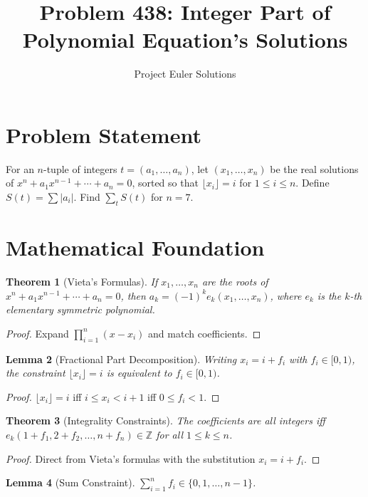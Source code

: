 \documentclass[11pt]{article}
\title{Problem 438: Integer Part of Polynomial Equation's Solutions}
\author{Project Euler Solutions}
\date{}
\newtheorem{theorem}{Theorem}
\newtheorem{lemma}[theorem]{Lemma}
\begin{document}
\maketitle

\section{Problem Statement}
For an $n$-tuple of integers $t = (a_1, \ldots, a_n)$, let $(x_1, \ldots, x_n)$ be the real solutions of $x^n + a_1 x^{n-1} + \cdots + a_n = 0$, sorted so that $\lfloor x_i \rfloor = i$ for $1 \leq i \leq n$. Define $S(t) = \sum |a_i|$. Find $\sum_t S(t)$ for $n = 7$.

\section{Mathematical Foundation}

\begin{theorem}[Vieta's Formulas]
If $x_1, \ldots, x_n$ are the roots of $x^n + a_1 x^{n-1} + \cdots + a_n = 0$, then $a_k = (-1)^k e_k(x_1, \ldots, x_n)$, where $e_k$ is the $k$-th elementary symmetric polynomial.
\end{theorem}

\begin{proof}
Expand $\prod_{i=1}^n (x - x_i)$ and match coefficients.
\end{proof}

\begin{lemma}[Fractional Part Decomposition]
Writing $x_i = i + f_i$ with $f_i \in [0, 1)$, the constraint $\lfloor x_i \rfloor = i$ is equivalent to $f_i \in [0, 1)$.
\end{lemma}

\begin{proof}
$\lfloor x_i \rfloor = i$ iff $i \leq x_i < i + 1$ iff $0 \leq f_i < 1$.
\end{proof}

\begin{theorem}[Integrality Constraints]
The coefficients are all integers iff $e_k(1+f_1, 2+f_2, \ldots, n+f_n) \in \mathbb{Z}$ for all $1 \leq k \leq n$.
\end{theorem}

\begin{proof}
Direct from Vieta's formulas with the substitution $x_i = i + f_i$.
\end{proof}

\begin{lemma}[Sum Constraint]
$\sum_{i=1}^n f_i \in \{0, 1, \ldots, n-1\}$.
\end{lemma}
\end{document}
